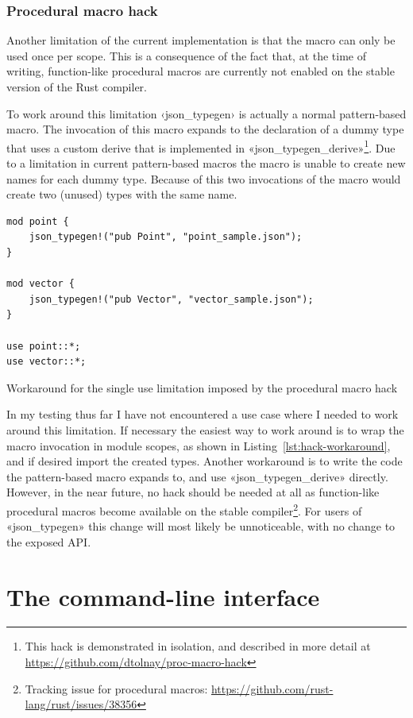 \subsubsection{Procedural macro hack}

Another limitation of the current implementation is that the macro can only be used once per scope. This is a consequence of the fact that, at the time of writing, function-like procedural macros are currently not enabled on the stable version of the Rust compiler.

To work around this limitation ‹json_typegen› is actually a normal pattern-based macro. The invocation of this macro expands to the declaration of a dummy type that uses a custom derive that is implemented in «json_typegen_derive»\footnote{This hack is demonstrated in isolation, and described in more detail at \url{https://github.com/dtolnay/proc-macro-hack}}. Due to a limitation in current pattern-based macros the macro is unable to create new names for each dummy type. Because of this two invocations of the macro would create two (unused) types with the same name.

\begin{listing}[ht!]
\begin{verbatim}
mod point {
    json_typegen!("pub Point", "point_sample.json");
}

mod vector {
    json_typegen!("pub Vector", "vector_sample.json");
}

use point::*;
use vector::*;
\end{verbatim}
\caption{Workaround for the single use limitation imposed by the procedural macro hack}
\label{lst:hack-workaround}
\end{listing}

In my testing thus far I have not encountered a use case where I needed to work around this limitation. If necessary the easiest way to work around is to wrap the macro invocation in module scopes, as shown in Listing~\ref{lst:hack-workaround}, and if desired import the created types. Another workaround is to write the code the pattern-based macro expands to, and use «json_typegen_derive» directly. However, in the near future, no hack should be needed at all as function-like procedural macros become available on the stable compiler\footnote{Tracking issue for procedural macros: \url{https://github.com/rust-lang/rust/issues/38356}}. For users of «json_typegen» this change will most likely be unnoticeable, with no change to the exposed API.

\section{The command-line interface}

